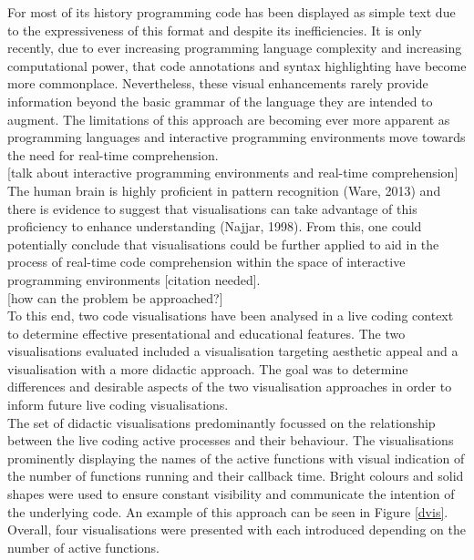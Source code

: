 \documentclass{article}
\begin{document}
For most of its history programming code has been displayed as simple text due to the expressiveness of this format and despite its inefficiencies. It is only recently, due to ever increasing programming language complexity and increasing computational power, that code annotations and syntax highlighting have become more commonplace. Nevertheless, these visual enhancements rarely provide information beyond the basic grammar of the language they are intended to augment. The limitations of this approach are becoming ever more apparent as programming languages and interactive programming environments move towards the need for real-time comprehension.\\

[talk about interactive programming environments and real-time comprehension]\\

The human brain is highly proficient in pattern recognition (Ware, 2013) and there is evidence to suggest that visualisations can take advantage of this proficiency to enhance understanding (Najjar, 1998). From this, one could potentially conclude that visualisations could be further applied to aid in the process of real-time code comprehension within the space of interactive programming environments [citation needed].\\

[how can the problem be approached?]\\

To this end, two code visualisations have been analysed in a live coding context to determine effective presentational and educational features. The two visualisations evaluated included a visualisation targeting aesthetic appeal and a visualisation with a more didactic approach. The goal was to determine differences and desirable aspects of the two visualisation approaches in order to inform future live coding visualisations.\\

The set of didactic visualisations predominantly focussed on the relationship between the live coding active processes and their behaviour. The visualisations prominently displaying the names of the active functions with visual indication of the number of functions running and their callback time. Bright colours and solid shapes were used to ensure constant visibility and communicate the intention of the underlying code. An example of this approach can be seen in Figure \ref{dvis}. Overall, four visualisations were presented with each introduced depending on the number of active functions.\\
\end{document}
